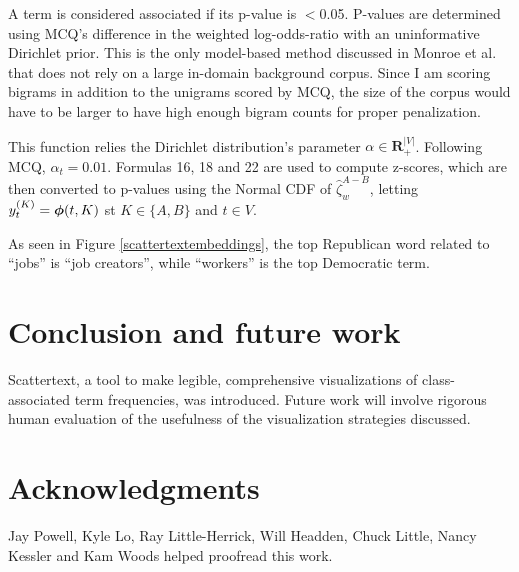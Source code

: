\documentclass[11pt,a4paper]{article}
\begin{document}
A term is considered associated if its p-value is $<$0.05.  P-values are determined using MCQ's difference in the weighted log-odds-ratio with an uninformative Dirichlet prior.  This is the only model-based method discussed in Monroe et al. that does not rely on a large in-domain background corpus.  Since I am scoring bigrams in addition to the unigrams scored by MCQ, the size of the corpus would have to be larger to have high enough bigram counts for proper penalization.

This function relies the Dirichlet distribution's parameter $\alpha \in \mathbf{R}_{+}^{|V|}$. Following MCQ, $\alpha_t = 0.01$.  Formulas 16, 18 and 22 are used to compute z-scores, which are then converted to p-values using the Normal CDF of $\hat{\zeta}_{w}^{A-B}$, letting $y^{(K)}_{t} = \mbox{\boldmath$\phi$}(t,K)$ st ${K}\in{\{A,B\}}$ and $t\in{V}$.

As seen in Figure \ref{scattertextembeddings}, the top Republican word related to ``jobs'' is ``job creators'', while ``workers'' is the top Democratic term.
\section{Conclusion and future work}
Scattertext, a tool to make legible, comprehensive visualizations of class-associated term frequencies, was introduced.  Future work will involve rigorous human evaluation of the usefulness of the visualization strategies discussed.
\section*{Acknowledgments}
Jay Powell, Kyle Lo, Ray Little-Herrick, Will Headden, Chuck Little, Nancy Kessler and Kam Woods helped proofread this work.
\vspace{-.5cm}


\end{document}
